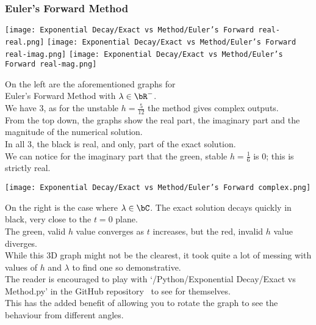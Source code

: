 \subsubsection{Euler's Forward Method}
\begin{multicols}{2}
	\begin{center}
	\texttt{[image: Exponential Decay/Exact vs Method/Euler's Forward real-real.png]}
	\texttt{[image: Exponential Decay/Exact vs Method/Euler's Forward real-imag.png]}
	\texttt{[image: Exponential Decay/Exact vs Method/Euler's Forward real-mag.png]}
	\end{center}
\columnbreak{}
	\par On the left are the aforementioned graphs for\\
	Euler's Forward Method with $\lambda \in \bR^{-}$.\\
	We have 3, as for the unstable $h=\frac{5}{12}$ the method gives complex outputs.\\
	From the top down, the graphs show the real part, the imaginary part and the magnitude of the numerical solution.\\
	In all 3, the black is real, and only, part of the exact solution.\\
	We can notice for the imaginary part that the green, stable $h = \frac{1}{6}$ is $0$; this is strictly real.\\
	\begin{center}
        \texttt{[image: Exponential Decay/Exact vs Method/Euler's Forward complex.png]}
        \end{center}
\end{multicols}
\par On the right is the case where $\lambda \in \bC$. The exact solution decays quickly in black, very close to the $t=0$ plane.\\
The green, valid $h$ value converges as $t$ increases, but the red, invalid $h$ value diverges.\\
While this 3D graph might not be the clearest, it took quite a lot of messing with values of $h$ and $\lambda$ to find one so demonstrative.\\
The reader is encouraged to play with `/Python/Exponential Decay/Exact vs Method.py' in the GitHub repository~\cite{GitHub_Repo} to see for themselves.\\
This has the added benefit of allowing you to rotate the graph to see the behaviour from different angles.

